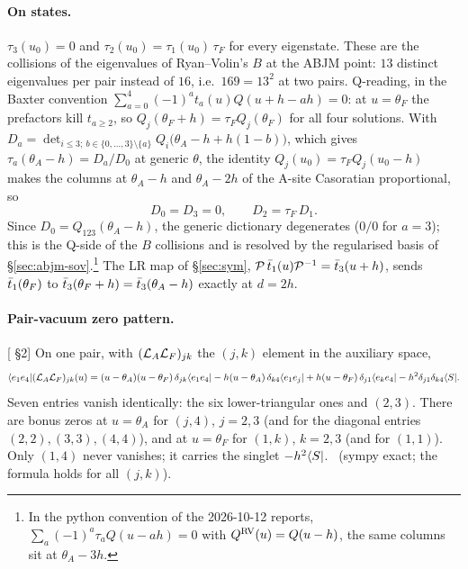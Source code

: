 \paragraph{On states.} $\tau_3(u_0)=0$ and $\tau_2(u_0)=\tau_1(u_0)\,\tau_F$ for every eigenstate. These are the collisions of
the eigenvalues of Ryan--Volin's $B$ at the ABJM point: $13$ distinct eigenvalues per pair instead of $16$, i.e.\ $169=13^2$
at two pairs. Q-reading, in the Baxter convention $\sum_{a=0}^4(-1)^at_a(u)Q(u+h-ah)=0$: at $u=\theta_F$ the prefactors
kill $t_{a\ge2}$, so $Q_j(\theta_F+h)=\tau_FQ_j(\theta_F)$ for all four solutions. With
$D_a=\det_{i\le3;\ b\in\{0,\dots,3\}\setminus\{a\}}Q_i\big(\theta_A-h+h(1-b)\big)$, which gives $\tau_a(\theta_A-h)=D_a/D_0$ at
generic $\theta$, the identity $Q_j(u_0)=\tau_FQ_j(u_0-h)$ makes the columns at $\theta_A-h$ and $\theta_A-2h$ of the A-site
Casoratian proportional, so
\begin{equation}
 D_0=D_3=0,\qquad D_2=\tau_F\,D_1 .
\end{equation}
Since $D_0=Q_{123}(\theta_A-h)$, the generic dictionary degenerates ($0/0$ for $a=3$); this is the Q-side of the $B$
collisions and is resolved by the regularised basis of \S\ref{sec:abjm-sov}.\footnote{In the python convention of the
2026-10-12 reports, $\sum_a(-1)^a\tau_aQ(u-ah)=0$ with $Q^{\rm RV}(u)=Q(u-h)$, the same columns sit at $\theta_A-3h$.} The LR map of \S\ref{sec:sym}, $\mathcal P\,\bar t_1(u)\mathcal P^{-1}=\bar t_3(u+h)$, sends $\bar t_1(\theta_F)$ to $\bar t_3(\theta_F+h)=\bar t_3(\theta_A-h)$
exactly at $d=2h$.

\paragraph{Pair-vacuum zero pattern.} [ \S2] On one pair, with $(\mathcal L_A\mathcal L_F)_{jk}$ the $(j,k)$
element in the auxiliary space,
\begin{equation}
 \langle e_1e_4|(\mathcal L_A\mathcal L_F)_{jk}(u)=(u-\theta_A)(u-\theta_F)\,\delta_{jk}\langle e_1e_4|-h(u-\theta_A)\,\delta_{k4}\langle e_1e_j|
 +h(u-\theta_F)\,\delta_{j1}\langle e_ke_4|-h^2\delta_{j1}\delta_{k4}\langle S| .
\end{equation}
Seven entries vanish identically: the six lower-triangular ones and $(2,3)$. There are bonus zeros at $u=\theta_A$ for
$(j,4)$, $j=2,3$ (and for the diagonal entries $(2,2),(3,3),(4,4)$), and at $u=\theta_F$ for $(1,k)$, $k=2,3$ (and
for $(1,1)$). Only $(1,4)$ never vanishes; it carries the singlet $-h^2\langle S|$. \ex\ (sympy exact; the formula holds for all
$(j,k)$).

